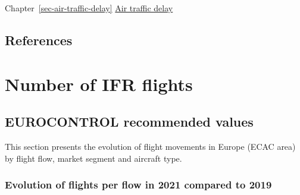 \documentclass[
  11pt,
  a4paper,
]{book}
\begin{document}
Chapter~\ref{sec-air-traffic-delay}
\protect\hyperlink{sec-air-traffic-delay}{Air traffic delay}

\hypertarget{references-2}{%
\section{References}\label{references-2}}

\hypertarget{sec-number-of-ifr-flights}{%
\chapter{Number of IFR flights}\label{sec-number-of-ifr-flights}}

\hypertarget{eurocontrol-recommended-values}{%
\section{EUROCONTROL recommended
values}\label{eurocontrol-recommended-values}}

This section presents the evolution of flight movements in Europe (ECAC
area) by flight flow, market segment and aircraft type.

\hypertarget{evolution-of-flights-per-flow-in-2021-compared-to-2019}{%
\subsection{Evolution of flights per flow in 2021 compared to
2019}\label{evolution-of-flights-per-flow-in-2021-compared-to-2019}}
\end{document}
